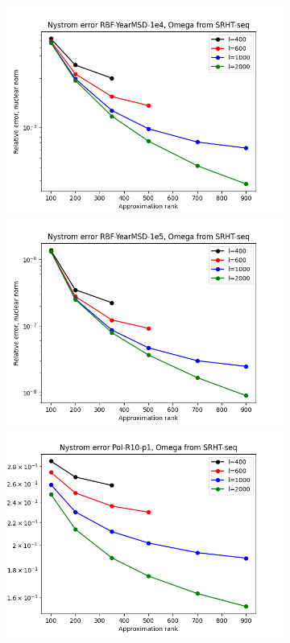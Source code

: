 \documentclass{article}
\theoremstyle{definition}
\begin{document}
\begin{appendices}
\begin{figure}
\begin{subfigure}[t]{0.35\textwidth}
    \includegraphics[width=\textwidth]{plots/relerror/relerror_RBF-YearMSD-1e4_SRHT-seq.png}
    \includegraphics[width=\textwidth]{plots/relerror/relerror_RBF-YearMSD-1e5_SRHT-seq.png}
    \includegraphics[width=\textwidth]{plots/relerror/relerror_Pol-R10-p1_SRHT-seq.png}

\end{subfigure}
\end{figure}
\end{appendices}
\end{document}
